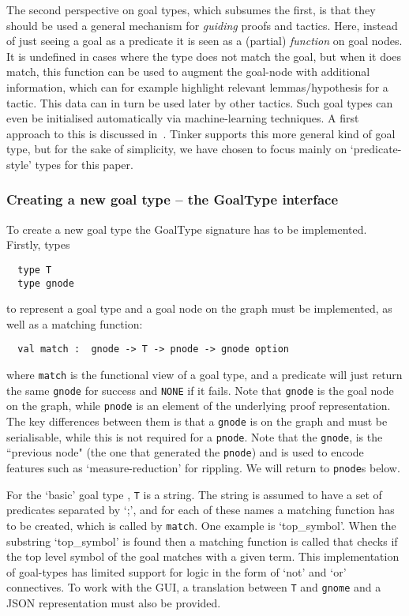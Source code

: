 \documentclass[submission,copyright,creativecommons]{eptcs}
\begin{document}
The second perspective on goal types, which subsumes the first, is that they should be used a general mechanism for \emph{guiding} proofs and tactics. Here, instead of just seeing a goal as a predicate it is seen as
a (partial) \emph{function} on goal nodes. It is undefined in cases where the type does not match the goal, but when it does match, this function can be used to augment the goal-node with additional information, which can for example highlight relevant lemmas/hypothesis for a tactic. This data can in turn be used later by other tactics. Such goal types can even be initialised automatically via machine-learning techniques. A first approach to this is discussed in~\cite{grov13a}.  Tinker supports this more general kind of goal type, but for the sake of simplicity, we have chosen to focus mainly on `predicate-style' types for this paper.

\subsubsection{Creating a new goal type -- the GoalType interface}

To create a new goal type the GoalType signature has to be implemented. Firstly, types
\begin{verbatim}
  type T
  type gnode
\end{verbatim}
to represent a goal type and a goal node on the graph must be implemented, as well as a matching function:
\begin{verbatim}
  val match :  gnode -> T -> pnode -> gnode option
\end{verbatim}
where \texttt{match} is the functional view of a goal type, and a predicate will just return the same \texttt{gnode} for success and \texttt{NONE} if it fails.
Note that \texttt{gnode} is the goal node on the graph, while \texttt{pnode} is an element of the underlying proof representation. The key differences between them is that a \texttt{gnode} is on the graph and must be serialisable, while this is not required for a \texttt{pnode}. Note that the  \texttt{gnode}, is the ``previous node" (the one that generated the \texttt{pnode}) and is used to encode features such as `measure-reduction' for rippling. We will return to \texttt{pnode}s below.

For the `basic' goal type \cite{LPAR13}, \texttt{T} is a string. The string is assumed to have a set of predicates separated by `;', and for each of these names a matching function has to be created, which is called by \texttt{match}. One example is  `top\_symbol'. When the substring `top\_symbol' is found then a matching function is called that checks if the top level symbol of the goal matches with a given term. This implementation of goal-types has limited support for logic in the form of `not' and `or' connectives. To work with the GUI, a translation between \texttt{T} and \texttt{gnome} and a JSON representation must also be provided.
\end{document}
